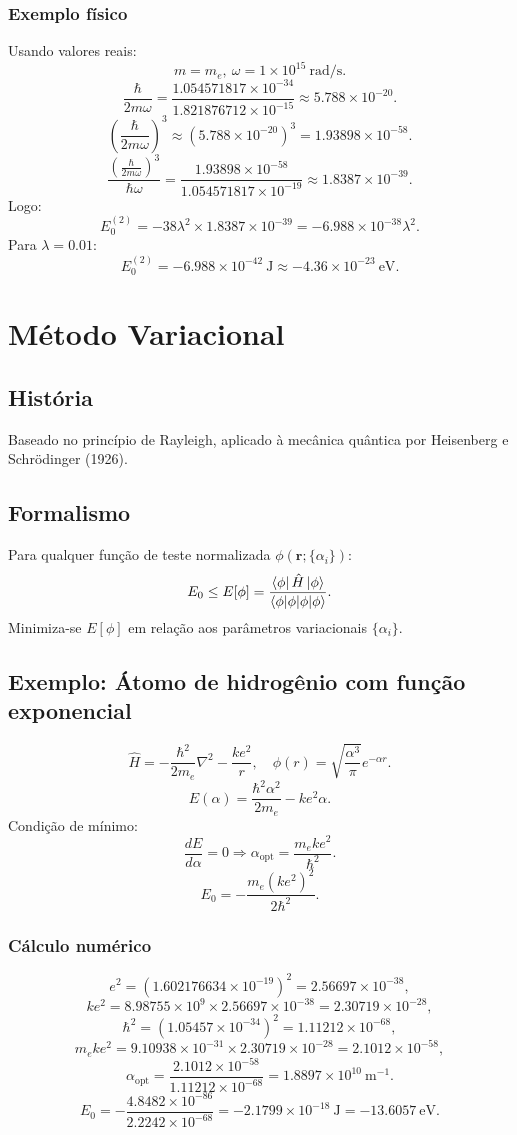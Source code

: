 \documentclass[12pt]{article}
\begin{document}
\subsubsection{Exemplo físico}
Usando valores reais:
\[
m=m_e,\ \omega=1\times10^{15}\ \text{rad/s}.
\]
\[
\frac{\hbar}{2m\omega}=\frac{1.054571817\times10^{-34}}{1.821876712\times10^{-15}}\approx5.788\times10^{-20}.
\]
\[
\left(\frac{\hbar}{2m\omega}\right)^3\approx(5.788\times10^{-20})^3=1.93898\times10^{-58}.
\]
\[
\frac{\left(\frac{\hbar}{2m\omega}\right)^3}{\hbar\omega}=\frac{1.93898\times10^{-58}}{1.054571817\times10^{-19}}\approx1.8387\times10^{-39}.
\]
Logo:
\[
E_0^{(2)}=-38\lambda^2\times1.8387\times10^{-39}=-6.988\times10^{-38}\lambda^2.
\]
Para $\lambda=0.01$:
\[
E_0^{(2)}=-6.988\times10^{-42}\ \text{J}\approx-4.36\times10^{-23}\ \text{eV}.
\]

\section{Método Variacional}

\subsection{História}
Baseado no princípio de Rayleigh, aplicado à mecânica quântica por Heisenberg e Schrödinger (1926).

\subsection{Formalismo}
Para qualquer função de teste normalizada $\phi(\mathbf{r};\{\alpha_i\})$:
\[
E_0 \le E[\phi] = \frac{\bra{\phi}\hat H\ket{\phi}}{\braket{\phi|\phi}}.
\]
Minimiza-se $E[\phi]$ em relação aos parâmetros variacionais $\{\alpha_i\}$.

\subsection{Exemplo: Átomo de hidrogênio com função exponencial}
\[
\hat H=-\frac{\hbar^2}{2m_e}\nabla^2-\frac{k e^2}{r},\quad
\phi(r)=\sqrt{\frac{\alpha^3}{\pi}}e^{-\alpha r}.
\]
\[
E(\alpha)=\frac{\hbar^2\alpha^2}{2m_e}-k e^2\alpha.
\]
Condição de mínimo:
\[
\frac{dE}{d\alpha}=0\Rightarrow \alpha_{\text{opt}}=\frac{m_e k e^2}{\hbar^2}.
\]
\[
E_0=-\frac{m_e(k e^2)^2}{2\hbar^2}.
\]

\subsubsection{Cálculo numérico}
\[
e^2=(1.602176634\times10^{-19})^2=2.56697\times10^{-38},
\]
\[
k e^2=8.98755\times10^{9}\times2.56697\times10^{-38}=2.30719\times10^{-28},
\]
\[
\hbar^2=(1.05457\times10^{-34})^2=1.11212\times10^{-68},
\]
\[
m_e k e^2=9.10938\times10^{-31}\times2.30719\times10^{-28}=2.1012\times10^{-58},
\]
\[
\alpha_{\text{opt}}=\frac{2.1012\times10^{-58}}{1.11212\times10^{-68}}=1.8897\times10^{10}\ \text{m}^{-1}.
\]
\[
E_0=-\frac{4.8482\times10^{-86}}{2.2242\times10^{-68}}=-2.1799\times10^{-18}\ \text{J}=-13.6057\ \text{eV}.
\]
\end{document}
